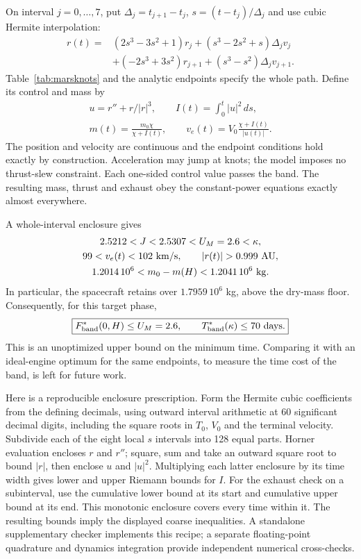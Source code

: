 On interval $j=0,\ldots,7$, put $\Delta_j=t_{j+1}-t_j$,
$s=(t-t_j)/\Delta_j$ and use cubic Hermite interpolation:
\begin{equation}
\begin{split}
 r(t)={}&(2s^3-3s^2+1)r_j
       +(s^3-2s^2+s)\Delta_j v_j\\
 &+(-2s^3+3s^2)r_{j+1}
       +(s^3-s^2)\Delta_j v_{j+1}.
\end{split}
\label{eq:marshermite}
\end{equation}
Table~\ref{tab:marsknots} and the analytic endpoints specify the whole
path. Define its control and mass by
\begin{equation}
\begin{gathered}
 u=r''+r/|r|^3,\qquad I(t)=\int_0^t|u|^2\,ds,\\
 m(t)=\frac{m_0\chi}{\chi+I(t)},\qquad
 v_e(t)=V_0\frac{\chi+I(t)}{|u(t)|}.
\end{gathered}
\end{equation}
The position and velocity are continuous and the endpoint conditions
hold exactly by construction. Acceleration may jump at knots; the
model imposes no thrust-slew constraint. Each one-sided control value
passes the band. The resulting mass, thrust and exhaust obey the
constant-power equations exactly almost everywhere.

A whole-interval enclosure gives
\begin{equation}
\begin{gathered}
 2.5212<J<2.5307< U_M=2.6<\kappa,\\
 99<v_e(t)<102\ {\rm km/s},\qquad |r(t)|>0.999\ {\rm AU},\\
 1.2014\,10^6<m_0-m(H)<1.2041\,10^6\ {\rm kg}.
\end{gathered}
\end{equation}
In particular, the spacecraft retains over $1.7959\,10^6$ kg, above
the dry-mass floor. Consequently, for this target phase,
\begin{equation}
 \boxed{F_{\rm band}^*(0,H)\le U_M=2.6,\qquad T_{\rm band}^*(\kappa)\le70\ {\rm days}.}
\end{equation}
This is an unoptimized upper bound on the minimum time. Comparing it
with an ideal-engine optimum for the same endpoints, to measure the
time cost of the band, is left for future work.

Here is a reproducible enclosure prescription. Form the Hermite cubic
coefficients from the defining decimals, using outward interval arithmetic
at 60 significant decimal digits, including the square roots in $T_0$,
$V_0$ and the terminal velocity. Subdivide each of the eight local
$s$ intervals into 128 equal parts. Horner evaluation encloses $r$ and
$r''$; square, sum and take an outward square root to bound $|r|$,
then enclose $u$ and $|u|^2$. Multiplying each latter enclosure by its
time width gives lower and upper Riemann bounds for $I$. For the
exhaust check on a subinterval, use the cumulative lower bound at its
start and cumulative upper bound at its end. This monotonic enclosure
covers every time within it. The resulting bounds imply the displayed
coarse inequalities. A standalone supplementary checker implements
this recipe; a separate floating-point quadrature and dynamics
integration provide independent numerical cross-checks.
